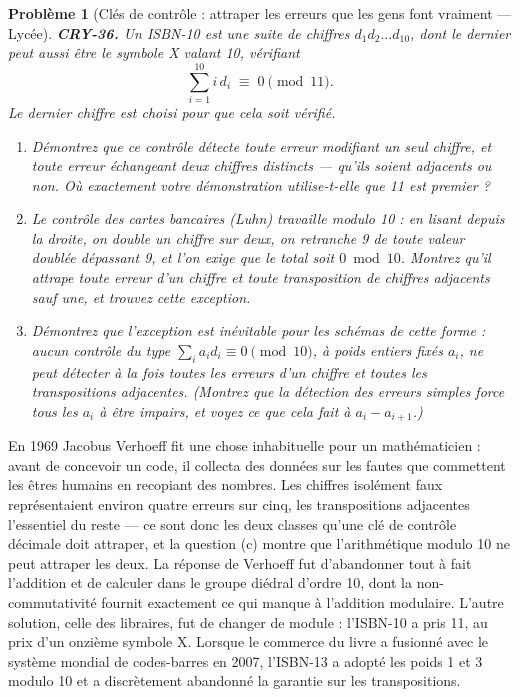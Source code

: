 \documentclass[11pt]{article}
\newtheorem{problem}{Problème}
\begin{document}
\begin{problem}[{Clés de contrôle : attraper les erreurs que les gens font vraiment --- Lycée}]
\textbf{CRY-36.} Un ISBN-10 est une suite de chiffres $d_1 d_2 \dots d_{10}$, dont le
dernier peut aussi être le symbole X valant 10, vérifiant
\[ \sum_{i=1}^{10} i \, d_i \;\equiv\; 0 \pmod{11}. \]
Le dernier chiffre est choisi pour que cela soit vérifié.
\begin{enumerate}
\item[(a)] Démontrez que ce contrôle détecte toute erreur modifiant un seul chiffre, et toute erreur
échangeant deux chiffres distincts --- qu'ils soient adjacents ou non. Où exactement votre
démonstration utilise-t-elle que 11 est premier ?
\item[(b)] Le contrôle des cartes bancaires (Luhn) travaille modulo 10 : en lisant depuis la droite,
on double un chiffre sur deux, on retranche 9 de toute valeur doublée dépassant 9, et l'on
exige que le total soit $0 \bmod 10$. Montrez qu'il attrape toute erreur d'un chiffre et
toute transposition de chiffres \textit{adjacents} sauf une, et trouvez cette exception.
\item[(c)] Démontrez que l'exception est inévitable pour les schémas de cette forme : aucun contrôle
du type $\sum_i a_i d_i \equiv 0 \pmod{10}$, à poids entiers fixés $a_i$, ne peut
détecter à la fois toutes les erreurs d'un chiffre et toutes les transpositions adjacentes.
(Montrez que la détection des erreurs simples force tous les $a_i$ à être impairs, et voyez
ce que cela fait à $a_i - a_{i+1}$.)
\end{enumerate}

\end{problem}

\noindent En 1969 Jacobus Verhoeff fit une chose inhabituelle pour un mathématicien :
avant de concevoir un code, il collecta des données sur les fautes que commettent les êtres
humains en recopiant des nombres. Les chiffres isolément faux représentaient environ quatre
erreurs sur cinq, les transpositions adjacentes l'essentiel du reste --- ce sont donc les deux
classes qu'une clé de contrôle décimale doit attraper, et la question (c) montre que
l'arithmétique modulo 10 ne peut attraper les deux. La réponse de Verhoeff fut d'abandonner
tout à fait l'addition et de calculer dans le groupe diédral d'ordre 10, dont la
non-commutativité fournit exactement ce qui manque à l'addition modulaire. L'autre solution,
celle des libraires, fut de changer de module : l'ISBN-10 a pris 11, au prix d'un onzième
symbole X. Lorsque le commerce du livre a fusionné avec le système mondial de codes-barres en
2007, l'ISBN-13 a adopté les poids 1 et 3 modulo 10 et a discrètement abandonné la garantie
sur les transpositions.
\end{document}
